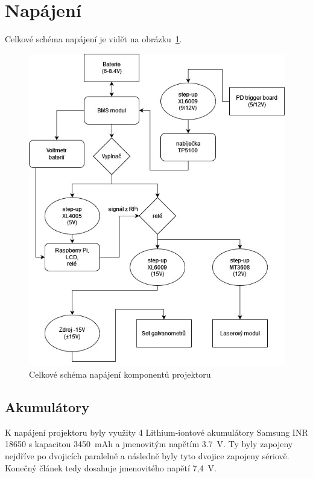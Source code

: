 \section{Napájení}
Celkové schéma napájení je vidět na obrázku~\ref{fig:power-schem-full}.

\begin{figure}[!h]
  \centering
  \includegraphics[width=\textwidth]{img/power-schem-full.jpg}
  \caption{\label{fig:power-schem-full} Celkové schéma napájení komponentů projektoru}
\end{figure}

\subsection{Akumulátory}
K napájení projektoru byly využity 4 Lithium-iontové akumulátory Samsung INR 18650 s kapacitou 3450~mAh a jmenovitým napětím 3.7~V. Ty byly zapojeny nejdříve po dvojicích paralelně a následně byly tyto dvojice zapojeny sériově. Konečný článek tedy dosahuje jmenovitého napětí 7,4~V.

